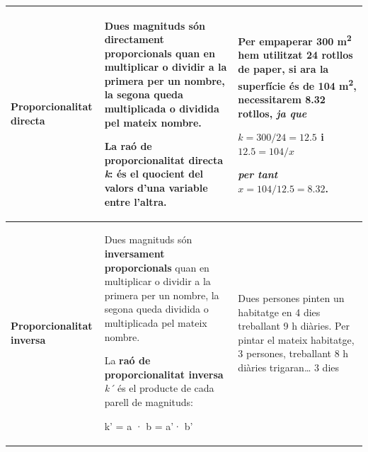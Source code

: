 \pagebreak
\mbox{}
\vspace*{-0.4cm}
\resum
 
\begin{longtable}{|p{}|p{}|p{}|} \hline
\cellcolor{lightgray}\begin{minipage}[t]{0.22\columnwidth}\raggedright\strut
\textbf{Proporcionalitat directa}\strut
\end{minipage} & \begin{minipage}[t]{0.35\columnwidth}\raggedright\strut
Dues magnituds són \textbf{directament} \textbf{proporcionals} quan en
multiplicar o dividir a la primera per un nombre, la segona queda
multiplicada o dividida pel mateix nombre.

La \textbf{raó de proporcionalitat directa} \emph{\textbf{k}}: és
el quocient del valors d'una
variable entre l'altra.\strut
\end{minipage} & \begin{minipage}[t]{0.38\columnwidth}\raggedright\strut
Per empaperar 300 m\textsuperscript{2} hem utilitzat 24 rotllos de
paper, si ara la superfície és de 104 m\textsuperscript{2}, necessitarem
8.32 rotllos, \emph{ja que}

 $k = 300/24 = 12.5$  i  $12.5 = 104/x$
 
 
\emph{per tant} $x = 104/12.5 = 8.32$.\strut
\end{minipage}\tabularnewline \hline

	

\cellcolor{lightgray}
\begin{minipage}[t]{0.22\columnwidth}\raggedright\strut
\textbf{Proporcionalitat inversa}\strut
\end{minipage} & \begin{minipage}[t]{0.35\columnwidth}\raggedright\strut
Dues magnituds són \textbf{inversament} \textbf{proporcionals} quan en
multiplicar o dividir a la primera per un nombre, la segona queda
dividida o multiplicada pel mateix nombre.

La \textbf{raó de proporcionalitat inversa} \emph{k´} és el producte de
cada parell de magnituds:

k' = a · b = a'· b'\strut
\end{minipage} & \begin{minipage}[t]{0.38\columnwidth}\raggedright\strut
Dues persones pinten un habitatge en 4 dies treballant 9 h diàries. Per
pintar el mateix habitatge, 3 persones, treballant 8 h diàries
trigaran\ldots{} 3 dies\strut
\end{minipage}\tabularnewline\hline


\end{longtable}
